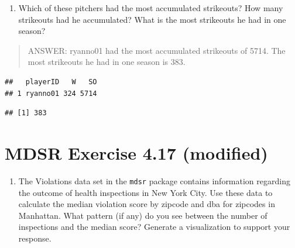 \documentclass[
]{article}
\newenvironment{Shaded}{\begin{snugshade}}{\end{snugshade}}
\newcommand{\CommentTok}[1]{\textcolor[rgb]{0.56,0.35,0.01}{\textit{#1}}}
\newcommand{\FunctionTok}[1]{\textcolor[rgb]{0.00,0.00,0.00}{#1}}
\newcommand{\NormalTok}[1]{#1}
\newcommand{\OtherTok}[1]{\textcolor[rgb]{0.56,0.35,0.01}{#1}}
\newcommand{\SpecialCharTok}[1]{\textcolor[rgb]{0.00,0.00,0.00}{#1}}
\newcommand{\StringTok}[1]{\textcolor[rgb]{0.31,0.60,0.02}{#1}}
\providecommand{\tightlist}{%
  \setlength{\itemsep}{0pt}\setlength{\parskip}{0pt}}
\begin{document}
\begin{enumerate}
\def\labelenumi{\alph{enumi}.}
\setcounter{enumi}{1}
\tightlist
\item
  Which of these pitchers had the most accumulated strikeouts? How many
  strikeouts had he accumulated? What is the most strikeouts he had in
  one season?
\end{enumerate}

\begin{quote}
ANSWER: ryanno01 had the most accumulated strikeouts of 5714. The most
strikeouts he had in one season is 383.
\end{quote}

\begin{Shaded}
\end{Shaded}

\begin{verbatim}
##   playerID   W   SO
## 1 ryanno01 324 5714
\end{verbatim}

\begin{Shaded}
\end{Shaded}

\begin{verbatim}
## [1] 383
\end{verbatim}

\newpage

\hypertarget{mdsr-exercise-4.17-modified}{%
\section{MDSR Exercise 4.17
(modified)}\label{mdsr-exercise-4.17-modified}}

\begin{enumerate}
\def\labelenumi{\alph{enumi}.}
\tightlist
\item
  The Violations data set in the \texttt{mdsr} package contains
  information regarding the outcome of health inspections in New York
  City. Use these data to calculate the median violation score by
  zipcode and dba for zipcodes in Manhattan. What pattern (if any) do
  you see between the number of inspections and the median score?
  Generate a visualization to support your response.
\end{enumerate}
\end{document}

